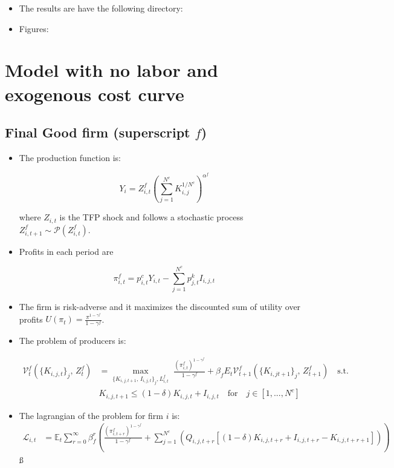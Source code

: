 \documentclass[11pt]{article}
\newcommand{\E}{\mathbb{E}}
\numberwithin{equation}{section}
\begin{document}
\begin{itemize}
	\item The results are have the following directory:
	\item Figures:
\end{itemize}
\newpage
\section{Model with no labor and exogenous cost curve}

\subsection{Final Good firm (superscript $f$)}

\begin{itemize}
	
	\item The production function is:
	
	$$Y_i = Z^f_{i,t} \left( \sum_{j=1}^{N^c } K^{1/N^c}_{i,j}\right)^{\alpha^f}$$
	
	where $Z_{i,t}$ is the TFP shock and follows a stochastic process $Z^f_{i,t+1} \sim \mathcal{P}(Z^f_{i,t})$. 
	
	\item Profits in each period are
	
	$$\pi^f_{i,t}=p^c_{i,t} Y_{i,t}-\sum_{j=1}^{N^c} p^k_{j,t} I_{i,j,t}$$
	
	\item The firm is risk-adverse and it maximizes the discounted sum of utility over profits $U(\pi_t) = \frac{\pi^{1-\gamma^f}}{1-\gamma^f}$.
	
	\item The problem of producers is:
	
	\begin{align*}
	\mathcal{V}_{t}^{f}\left(\{K_{i,j,t}\}_j,\,Z_t^f\right)&=\max_{\{K_{i,j,t+1},\, I_{i,j,t}\}_j,  L^f_{i,t}}\,\,
	\frac{\left(\pi_{i,t}^f\right)^{1-\gamma^f}}{1-\gamma^f}+\beta_f E_{t}\mathcal{V}^f_{t+1}(\{K_{i,jt+1}\}_j,\,Z_{t+1}^f)\quad\text{{s.t.}}\\
	&K_{i,j,t+1} \leq(1-\delta)K_{i,j,t}+I_{i,j,t} \quad \text{for} \quad j \in [1,...,N^c]
	\end{align*}
	
	\item The lagrangian of the problem for firm $i$ is:
	\begin{align*}
	\mathcal{L}_{i,t} &= \E_t \sum_{r=0}^{\infty}\beta^r_f \left(\frac{\left(\pi_{i,t+r}^f\right)^{1-\gamma^f}}{1-\gamma^f} +
	\sum_{j=1}^{N^c} \left(Q_{i,j,t+r} [(1-\delta)K_{i,j,t+r}+I_{i,j,t+r} -K_{i,j,t+r+1}]\right) \right)
	\end{align*}ß
	

\end{itemize}
\end{document}
